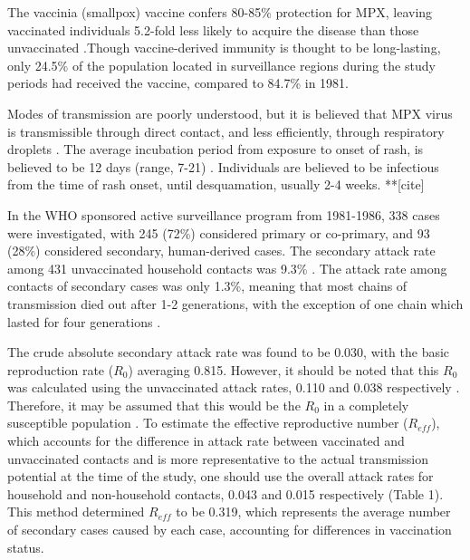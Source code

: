 The vaccinia (smallpox) vaccine confers 80-85\% protection for MPX, leaving vaccinated individuals 5.2-fold less likely to acquire the disease than those unvaccinated \cite{Fine1988, Rimoin2010}.Though vaccine-derived immunity is thought to be long-lasting, only 24.5\% of the population located in surveillance regions during the study periods had received the vaccine, compared to 84.7\% in 1981. \cite{Rimoin2010, Jezek1988, Jezek1987}

Modes of transmission are poorly understood, but it is believed that MPX virus is transmissible through direct contact, and less efficiently, through respiratory droplets \cite{DiGiulio2004}. The average incubation period from exposure to onset of rash, is believed to be 12 days (range, 7-21) \cite{Jezek1987, Hutin2001}. Individuals are believed to be infectious from the time of rash onset, until desquamation, usually 2-4 weeks. **[cite]

In the WHO sponsored active surveillance program from 1981-1986, 338 cases were investigated, with 245 (72\%) considered primary or co-primary, and 93 (28\%) considered secondary, human-derived cases. The secondary attack rate among 431 unvaccinated household contacts was 9.3\% \cite{Jezek1988}. The attack rate among contacts of secondary cases was only 1.3\%, meaning that most chains of transmission died out after 1-2 generations, with the exception of one chain which lasted for four generations \cite{Jezek1986}.

The crude absolute  secondary attack rate was found to be 0.030, with the basic reproduction rate ($R_{0}$) averaging 0.815. However, it should be noted that this $R_{0}$ was calculated using the unvaccinated attack rates, 0.110 and 0.038 respectively \cite{Fine1988}. Therefore, it may be assumed that this would be the $R_{0}$ in a completely susceptible population \cite{Blumberg2014}. To estimate the effective reproductive number ($R_{eff}$), which accounts for the difference in attack rate between vaccinated and unvaccinated contacts and is more representative to the actual transmission potential at the time of the study, one should use the overall attack rates for household and non-household contacts, 0.043 and 0.015 respectively (Table 1). This method determined $R_{eff}$ to be 0.319, which represents the average number of secondary cases caused by each case, accounting for differences in vaccination status. 

